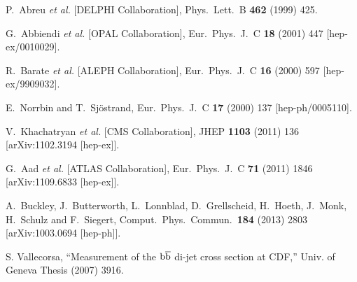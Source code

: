 \documentclass{tesisusb} %
\begin{document}
\begin{onehalfspace}
\begin{thebibliography}{99}
  P.~Abreu {\it et al.}  [DELPHI Collaboration],
  Phys.\ Lett.\ B {\bf 462} (1999) 425.

  G.~Abbiendi {\it et al.}  [OPAL Collaboration],
  Eur.\ Phys.\ J.\ C {\bf 18} (2001) 447
  [hep-ex/0010029].

  R.~Barate {\it et al.}  [ALEPH Collaboration],
  Eur.\ Phys.\ J.\ C {\bf 16} (2000) 597
  [hep-ex/9909032].
  
  E.~Norrbin and T.~Sjöstrand,
  Eur.\ Phys.\ J.\ C {\bf 17} (2000) 137
  [hep-ph/0005110].

  V.~Khachatryan {\it et al.}  [CMS Collaboration],
  JHEP {\bf 1103} (2011) 136
  [arXiv:1102.3194 [hep-ex]].

  G.~Aad {\it et al.}  [ATLAS Collaboration],
  Eur.\ Phys.\ J.\ C {\bf 71} (2011) 1846
  [arXiv:1109.6833 [hep-ex]].

  A.~Buckley, J.~Butterworth, L.~Lonnblad, D.~Grellscheid, H.~Hoeth, J.~Monk, H.~Schulz and F.~Siegert,
  Comput.\ Phys.\ Commun.\  {\bf 184} (2013) 2803
  [arXiv:1003.0694 [hep-ph]].

  S. Vallecorsa,
  ``Measurement of the ${\mathrm b}\overline{\mathrm b}$ di-jet cross section at CDF,''
  Univ. of Geneva Thesis (2007) 3916.

\end{thebibliography}


\end{onehalfspace}
\end{document}
